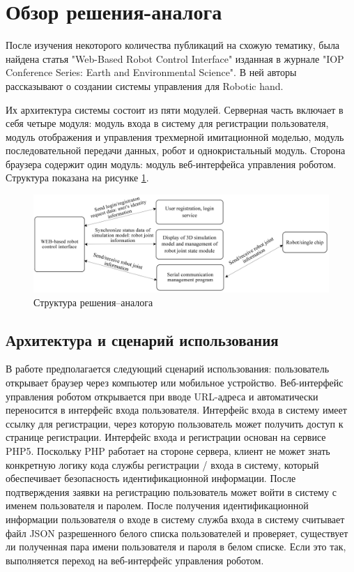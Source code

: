 \section{Обзор решения-аналога}

После изучения некоторого количества публикаций на схожую тематику, была найдена статья "Web-Based Robot Control Interface"{} изданная в журнале "IOP Conference Series: Earth and Environmental Science". В ней авторы рассказывают о создании системы управления для Robotic hand. 

Их архитектура системы состоит из пяти модулей. Серверная часть включает в себя четыре модуля: модуль входа в систему для регистрации пользователя, модуль отображения и управления трехмерной имитационной моделью, модуль последовательной передачи данных, робот и однокристальный модуль. Сторона браузера содержит один модуль: модуль веб-интерфейса управления роботом. Структура показана на рисунке \ref{img:china1}.

\begin{figure}[h!]
	\centering
	\includegraphics[width = \linewidth]{img/china1}
	\caption{Структура решения–аналога}
	\label{img:china1}
\end{figure}

\subsection{Архитектура и сценарий использования}
В работе предполагается следующий сценарий использования: пользователь открывает браузер через компьютер или мобильное устройство. Веб-интерфейс управления роботом открывается при вводе URL-адреса и автоматически переносится в интерфейс входа пользователя. Интерфейс входа в систему имеет ссылку для регистрации, через которую пользователь может получить доступ к странице регистрации. Интерфейс входа и регистрации основан на сервисе PHP5. Поскольку PHP работает на стороне сервера, клиент не может знать конкретную логику кода службы регистрации / входа в систему, который обеспечивает безопасность идентификационной информации. После подтверждения заявки на регистрацию пользователь может войти в систему с именем пользователя и паролем. После получения идентификационной информации пользователя о входе в систему служба входа в систему считывает файл JSON разрешенного белого списка пользователей и проверяет, существует ли полученная пара имени пользователя и пароля в белом списке. Если это так, выполняется переход на веб-интерфейс управления роботом.

